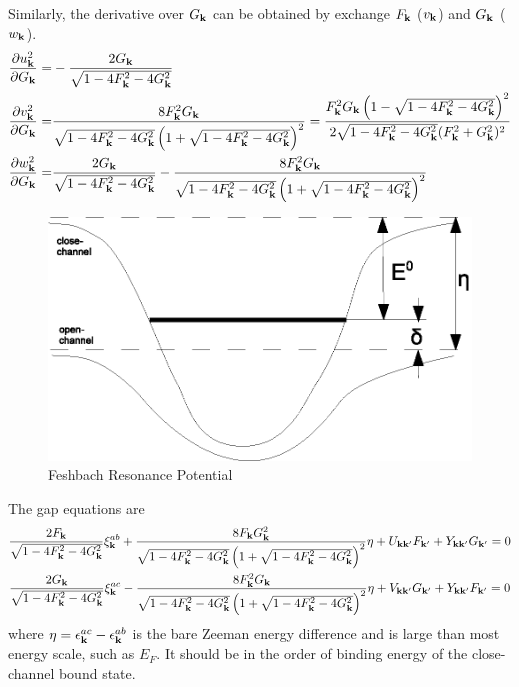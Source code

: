 \documentclass{article}
\begin{document}
Similarly, the derivative over $G_{\mathbf{k}}$ can be obtained by exchange $F_{\mathbf{k}}$ ($v_{\mathbf{k}}$) and $G_{\mathbf{k}}$ ($w_{\mathbf{k}}$).
\begin{equation}
\begin{split}
\frac{\partial{u_{\ensuremath{\mathbf{k}}}^2}}{\partial{G_{\ensuremath{\mathbf{k}}}}}=&-\frac{2 G_{\mathbf{k}}}{\sqrt{1-4 F_{\mathbf{k}}^2-4 G_{\mathbf{k}}^2}}\\
\frac{\partial{v_{\ensuremath{\mathbf{k}}}^2}}{\partial{G_{\ensuremath{\mathbf{k}}}}}=&\frac{8 F_{\mathbf{k}} ^{2}G_{\mathbf{k}}}{\sqrt{1-4 F_{\mathbf{k}}^2-4 G_{\mathbf{k}}^2} \left(1+\sqrt{1-4 F_{\mathbf{k}}^2-4 G_{\mathbf{k}}^2}\right)^2}
=\frac{F_{\mathbf{k}}^{2}G_{\mathbf{k}} \left(1-\sqrt{1-4 F_{\mathbf{k}}^2-4 G_{\mathbf{k}}^2}\right)^2}{2\sqrt{1-4 F_{\mathbf{k}}^2-4 G_{\mathbf{k}}^2} (F_{\mathbf{k}}^2 + G_{\mathbf{k}}^2)^2}\\
\frac{\partial{w_{\ensuremath{\mathbf{k}}}^2}}{\partial{G_{\ensuremath{\mathbf{k}}}}}=&\frac{2 G_{\mathbf{k}}}{\sqrt{1-4 F_{\mathbf{k}}^2-4 G_{\mathbf{k}}^2}}-\frac{8 F_{\mathbf{k}} ^{2}G_{\mathbf{k}}}{\sqrt{1-4 F_{\mathbf{k}}^2-4 G_{\mathbf{k}}^2} \left(1+\sqrt{1-4 F_{\mathbf{k}}^2-4 G_{\mathbf{k}}^2}\right)^2}
\end{split}
\end{equation}
\begin{figure}[hhtb]
	\centering
		\includegraphics[width=.50\textwidth]{image/FeshbachPotential}
	\caption{Feshbach Resonance Potential\label{fig:FeshbachPotential}}	
\end{figure}

The gap equations are 
\begin{subequations}\label{eq:20100909:fullgap}
\begin{gather}
\frac{2F_{\mathbf{k}}}{\sqrt{1-4 F_{\mathbf{k}}^2-4 G_{\mathbf{k}}^2}} \xi^{ab}_{\mathbf{k}}+\frac{8 F_{\mathbf{k}} G_{\mathbf{k}}^2}{\sqrt{1-4 F_{\mathbf{k}}^2-4 G_{\mathbf{k}}^2} \left(1+\sqrt{1-4 F_{\mathbf{k}}^2-4 G_{\mathbf{k}}^2}\right)^2}\eta+U_{\mathbf{k}\mathbf{k}'}F_{\mathbf{k}'}+Y_{\mathbf{k}\mathbf{k}'}G_{\mathbf{k}'}=0
\label{eq:20100909:fullgapa}\\
\frac{2G_{\mathbf{k}}}{\sqrt{1-4 F_{\mathbf{k}}^2-4 G_{\mathbf{k}}^2}} \xi^{ac}_{\mathbf{k}}-\frac{8 F_{\mathbf{k}}^{2} G_{\mathbf{k}}}{\sqrt{1-4 F_{\mathbf{k}}^2-4 G_{\mathbf{k}}^2} \left(1+\sqrt{1-4 F_{\mathbf{k}}^2-4 G_{\mathbf{k}}^2}\right)^2}\eta+V_{\mathbf{k}\mathbf{k}'}G_{\mathbf{k}'}+Y_{\mathbf{k}\mathbf{k}'}F_{\mathbf{k}'}=0
\label{eq:20100909:fullgapb}
\end{gather}
\end{subequations}
where $\eta=\epsilon^{ac}_{\mathbf{k}}-\epsilon^{ab}_{\mathbf{k}}$ is the bare Zeeman energy difference and is large than most energy scale, such as  $E_{F}$.  It should be in the order of binding energy of the close-channel bound state.   
\end{document}
